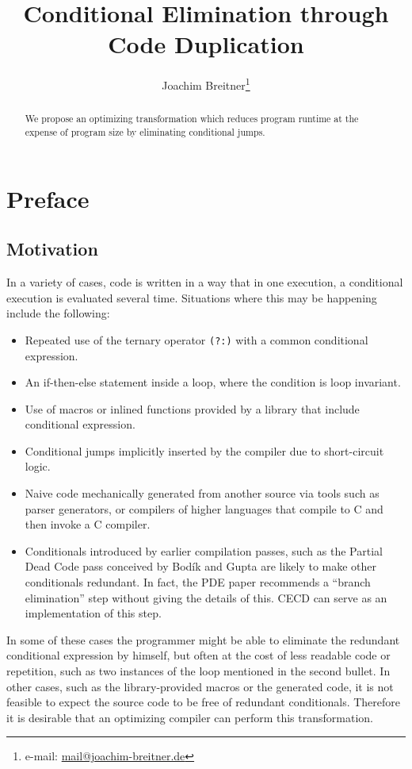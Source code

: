 \documentclass[halfparskip]{scrartcl}
\author{Joachim Breitner\footnote{e-mail: \href{mailto:mail@joachim-breitner.de}{mail@joachim-breitner.de}}}
\title{Conditional Elimination through Code Duplication}
\begin{document}
\maketitle

\begin{abstract}
We propose an optimizing transformation which reduces program runtime at the expense of program size by eliminating conditional jumps.
\end{abstract}



\section{Preface}

\subsection{Motivation}

In a variety of cases, code is written in a way that in one execution, a conditional execution is evaluated several time. Situations where this may be happening include the following:

\begin{itemize}
\item Repeated use of the ternary operator \texttt{(?:)} with a common conditional expression.
\item An if-then-else statement inside a loop, where the condition is loop invariant.
\item Use of macros or inlined functions provided by a library that include conditional expression.
\item Conditional jumps implicitly inserted by the compiler due to short-circuit logic.
\item Naive code mechanically generated from another source via tools such as parser generators, or compilers of higher languages that compile to C and then invoke a C compiler.
\item Conditionals introduced by earlier compilation passes, such as the Partial Dead Code pass conceived by Bodík and Gupta \citep{PDE} are likely to make other conditionals redundant. In fact, the PDE paper recommends a “branch elimination” step without giving the details of this. CECD can serve as an implementation of this step.
\end{itemize}

In some of these cases the programmer might be able to eliminate the redundant conditional expression by himself, but often at the cost of less readable code or repetition, such as two instances of the loop mentioned in the second bullet. In other cases, such as the library-provided macros or the generated code, it is not feasible to expect the source code to be free of redundant conditionals. Therefore it is desirable that an optimizing compiler can perform this transformation.
\end{document}
